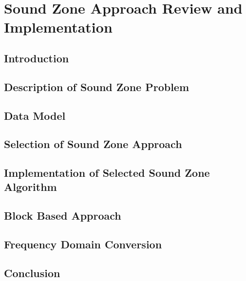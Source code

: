 \documentclass[10pt,twoside,openright,titlepage]{ce}
\begin{document}
\chapter{Sound Zone Approach Review and Implementation}
\label{ch:sound_zone}
\section{Introduction}
\label{ch:sound_zone:introduction}

\newpage
\section{Description of Sound Zone Problem}
\label{ch:sound_zone:problem}

\newpage
\section{Data Model}
\label{ch:sound_zone:data_model}

\newpage
\section{Selection of Sound Zone Approach}
\label{ch:sound_zone:constraints}

\newpage
\section{Implementation of Selected Sound Zone Algorithm}
\label{ch:sound_zone:approach_implementation}

\newpage
\section{Block Based Approach}
\label{ch:sound_zone:block_based}

\newpage
\section{Frequency Domain Conversion}
\label{ch:sound_zone:frequency_domain_conversion}

\newpage
\section{Conclusion}
\label{ch:sound_zone:conclusion}

\end{document}
